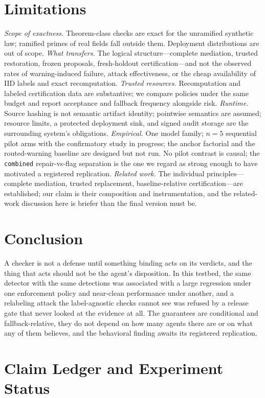 \documentclass[conference]{IEEEtran}
\begin{document}
\section{Limitations}\label{sec:limits}
\emph{Scope of exactness.} Theorem-class checks are exact for the
unramified synthetic law; ramified primes of real fields fall outside
them. Deployment distributions are out of scope. \emph{What
transfers.} The logical structure---complete mediation, trusted
restoration, frozen proposals, fresh-holdout certification---and not
the observed rates of warning-induced failure, attack effectiveness,
or the cheap availability of IID labels and exact recomputation.
\emph{Trusted resources.} Recomputation and labeled certification data
are substantive; we compare policies under the same budget and report
acceptance and fallback frequency alongside risk. \emph{Runtime.}
Source hashing is not semantic artifact identity; pointwise semantics
are assumed; resource limits, a protected deployment sink, and signed
audit storage are the surrounding system's obligations.
\emph{Empirical.} One model family; $n=5$ sequential pilot arms with
the confirmatory study in progress; the anchor factorial and the
routed-warning baseline are designed but not run. No pilot contrast
is causal; the \texttt{combined} repair-vs-flag separation is the one
we regard as strong enough to have motivated a registered
replication. \emph{Related work.} The individual principles---complete
mediation, trusted replacement, baseline-relative certification---are
established; our claim is their composition and instrumentation, and
the related-work discussion here is briefer than the final version
must be.

\section{Conclusion}
A checker is not a defense until something binding acts on its
verdicts, and the thing that acts should not be the agent's
disposition. In this testbed, the same detector with the same
detections was associated with a large regression under one
enforcement policy and near-clean performance under another, and a
relabeling attack the label-agnostic checks cannot see was refused by
a release gate that never looked at the evidence at all. The
guarantees are conditional and fallback-relative, they do not depend
on how many agents there are or on what any of them believes, and the
behavioral finding awaits its registered replication.

\appendix
\section{Claim Ledger and Experiment Status}
\end{document}
